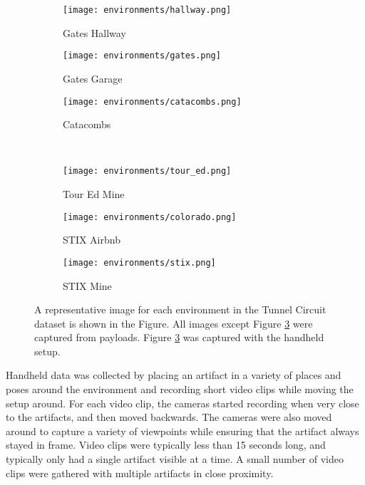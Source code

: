 \begin{figure}
	\centering
	\begin{subfigure}{0.3\textwidth}
		\texttt{[image: environments/hallway.png]}
		\caption{Gates Hallway}
		\label{environment_hallway}
	\end{subfigure}		
	\hfill
	\begin{subfigure}{0.3\textwidth}
		\texttt{[image: environments/gates.png]}
		\caption{Gates Garage}
		\label{environment_gates}		
	\end{subfigure}
	\hfill
	\begin{subfigure}{0.3\textwidth}
		\texttt{[image: environments/catacombs.png]}
		\caption{Catacombs}
		\label{environment_catacombs}
	\end{subfigure}
	\\
	\begin{subfigure}{0.3\textwidth}
		\texttt{[image: environments/tour\_ed.png]}
		\caption{Tour Ed Mine}
		\label{environment_tour_ed}
	\end{subfigure}		
	\hfill
	\begin{subfigure}{0.3\textwidth}
		\texttt{[image: environments/colorado.png]}
		\caption{STIX Airbnb}
		\label{environment_colorado}		
	\end{subfigure}
	\hfill
	\begin{subfigure}{0.3\textwidth}
		\texttt{[image: environments/stix.png]}
		\caption{STIX Mine}
		\label{environment_stix}
	\end{subfigure}	
	\caption[Representative dataset collection environment images]{A representative image for each environment in the Tunnel Circuit dataset is shown in the Figure. All images except Figure \ref{environment_catacombs} were captured from payloads. Figure \ref{environment_catacombs} was captured with the handheld setup.}
	\label{environments}
\end{figure}

Handheld data was collected by placing an artifact in a variety of places and poses around the environment and recording short video clips while moving the setup around. For each video clip, the cameras started recording when very close to the artifacts, and then moved backwards. The cameras were also moved around to capture a variety of viewpoints while ensuring that the artifact always stayed in frame. Video clips were typically less than 15 seconds long, and typically only had a single artifact visible at a time. A small number of video clips were gathered with multiple artifacts in close proximity.

